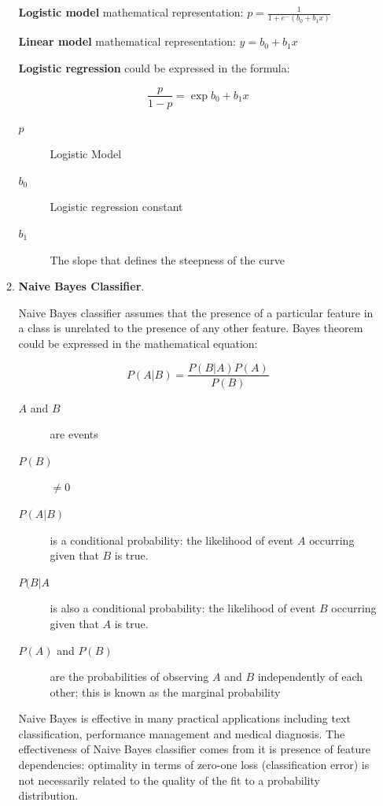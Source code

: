 \begin{enumerate}
\begin{enumerate}
        \textbf{Logistic model} mathematical representation: $p = \frac{1}{1 + e^-(b_{0} + b_{1}x)}$
        
        \textbf{Linear model} mathematical representation: $y = b_{0} + b_{1}x$
        
        \textbf{Logistic regression} could be expressed in the formula:
        
        \begin{equation}
             \frac{p}{1 - p} = \exp{b_{0} + b_{1}x}
        \end{equation}
        \begin{description}
            \item[$p$] Logistic Model 
            \item[$b_{0}$] Logistic regression constant
            \item[$b_{1}$] The slope that defines the steepness of the curve
        \end{description}
        
        \item \textbf{Naive Bayes Classifier}. 
        
        Naive Bayes classifier assumes that the presence of a particular feature in a class is unrelated to the presence of any other feature. Bayes theorem could be expressed in the mathematical equation:
        
        \begin{equation}
                P(A|B) = \frac{P(B|A)P(A)}{P(B)}
        \end{equation}
        \begin{description}
            \item[$A$ and $B$] are events 
            \item[$P(B)$] $\ne 0$
            \item[$P(A | B)$] is a conditional probability: the likelihood of event $A$ occurring given that $B$ is true.
            \item[$P(B | A$] is also a conditional probability: the likelihood of event $B$ occurring given that $A$ is true.
            \item[$P(A)$ and $P(B)$] are the probabilities of observing $A$ and $B$ independently of each other; this is known as the marginal probability
        \end{description}
        
        Naive Bayes \cite{BIB4} is effective in many practical applications including text classification, performance management and medical diagnosis. The effectiveness of Naive Bayes classifier comes from it is presence of feature dependencies: optimality in terms of zero-one loss (classification error) is not necessarily related to the quality of the fit to a probability distribution. 
        

\end{enumerate}
\end{enumerate}
